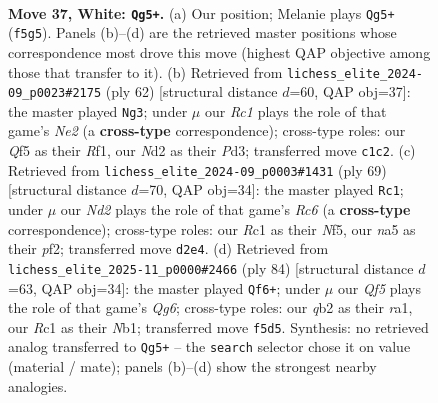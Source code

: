 \documentclass[11pt]{article}
\begin{document}
\clearpage

\begin{figure}[p]\centering
\begin{subfigure}{0.46\textwidth}\centering
\resizebox{\linewidth}{!}{%
\newchessgame
\chessboard[
  setfen={r6r/p3k1pp/3b4/n2p1Q2/p2P2PP/4P2K/1q1N4/2R5 w - - 6 37},
  showmover=false,
  pgfstyle=straightmove, color=movearrow, markmove={f5-g5}
]}
\caption{}
\end{subfigure}\hfill
\begin{subfigure}{0.46\textwidth}\centering
\resizebox{\linewidth}{!}{%
\newchessgame
\chessboard[
  setfen={Q7/p2bkr2/6pp/4pp2/P7/3PP3/2PqN1PP/5R1K w - - 2 32},
  showmover=false,
  pgfstyle=straightmove, color=movearrow, markmove={e2-g3}
]}
\caption{}
\end{subfigure}
\\[4pt]
\begin{subfigure}{0.46\textwidth}\centering
\resizebox{\linewidth}{!}{%
\newchessgame
\chessboard[
  setfen={3q4/p2P3k/1p4p1/4Qn2/8/2r5/Pp3PP1/3RR1K1 b - - 2 35},
  showmover=false,
  pgfstyle=straightmove, color=movearrow, markmove={c3-c1}
]}
\caption{}
\end{subfigure}\hfill
\begin{subfigure}{0.46\textwidth}\centering
\resizebox{\linewidth}{!}{%
\newchessgame
\chessboard[
  setfen={r4k2/pb6/1p4Q1/8/7p/7P/1PP1q2P/rNKR4 w - - 8 43},
  showmover=false,
  pgfstyle=straightmove, color=movearrow, markmove={g6-f6}
]}
\caption{}
\end{subfigure}
\caption{\textbf{Move 37, White: \texttt{Qg5+}.} (a) Our position; Melanie plays \texttt{Qg5+} (\texttt{f5g5}). Panels (b)--(d) are the retrieved master positions whose correspondence most drove this move (highest QAP objective among those that transfer to it). (b) Retrieved from \texttt{lichess\_elite\_2024-09\_p0023\#2175} (ply 62) [structural distance $d$=60, QAP obj=37]: the master played \texttt{Ng3}; under $\mu$ our \emph{Rc1} plays the role of that game's \emph{Ne2} (a \textbf{cross-type} correspondence); cross-type roles: our \emph{Q}f5 as their \emph{R}f1, our \emph{N}d2 as their \emph{P}d3; transferred move \texttt{c1c2}. (c) Retrieved from \texttt{lichess\_elite\_2024-09\_p0003\#1431} (ply 69) [structural distance $d$=70, QAP obj=34]: the master played \texttt{Rc1}; under $\mu$ our \emph{Nd2} plays the role of that game's \emph{Rc6} (a \textbf{cross-type} correspondence); cross-type roles: our \emph{R}c1 as their \emph{N}f5, our \emph{n}a5 as their \emph{p}f2; transferred move \texttt{d2e4}. (d) Retrieved from \texttt{lichess\_elite\_2025-11\_p0000\#2466} (ply 84) [structural distance $d$=63, QAP obj=34]: the master played \texttt{Qf6+}; under $\mu$ our \emph{Qf5} plays the role of that game's \emph{Qg6}; cross-type roles: our \emph{q}b2 as their \emph{r}a1, our \emph{R}c1 as their \emph{N}b1; transferred move \texttt{f5d5}. Synthesis: no retrieved analog transferred to \texttt{Qg5+} -- the \texttt{search} selector chose it on value (material / mate); panels (b)--(d) show the strongest nearby analogies.}
\label{fig:thought-m72}
\end{figure}
\end{document}
